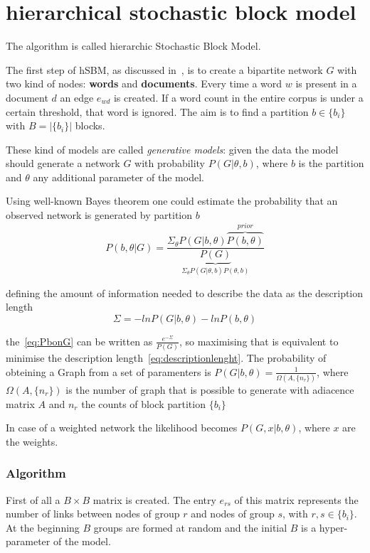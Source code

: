 \appendix
{}
\chapter{hierarchical stochastic block model}
The algorithm is called hierarchic Stochastic Block Model.

The first step of hSBM, as discussed in~\cite{peixoto2014efficient},
is to create a bipartite network $G$ with two kind of nodes: \textbf{words} and \textbf{documents}.
Every time a word $w$ is present in a document $d$ an edge $e_{wd}$ is created.
If a word count in the entire corpus is under a certain threshold, that word is ignored.
The aim is to find a partition $b\in\{b_i\}$ with $B=\left|\{b_i\}\right|$ blocks.

These kind of models are called \textit{generative models}: given the data the model
should generate a network $G$ with probability $P(G|\theta, b)$, where $b$ is
the partition and $\theta$ any additional parameter of the model.

Using well-known Bayes theorem one could estimate the probability that an
observed network is generated by partition $b$
\begin{equation}\label{eq:PbonG}
  P(b,\theta|G)=\frac{\Sigma_{\theta}P(G|b,\theta)\overbrace{P(b,\theta)}^{prior}}{\underbrace{P(G)}_{\Sigma_{\theta}P(G|\theta, b)P(\theta, b)}}
\end{equation}

defining the amount of information needed to describe the data as the description length
\begin{equation}\label{eq:descriptionlenght}
  \Sigma=-lnP(G|b,\theta)-lnP(b, \theta)
\end{equation}

the~\ref{eq:PbonG} can be written as $\frac{e^{-\Sigma}}{P(G)}$, so maximising
that is equivalent to minimise the description
length~\ref{eq:descriptionlenght}.
The probability of obteining a Graph from a set of paramenters is
$P(G|b,\theta)=\frac{1}{\Omega(A,\{n_r\})}$, where $\Omega(A,\{n_r\})$ is the
number of graph that is possible to generate with adiacence matrix $A$ and $n_r$
the counts of block partition $\{b_i\}$

In case of a weighted network the likelihood becomes $P(G,x|b,\theta)$, where $x$
are the weights.

\subsection{Algorithm}
First of all a $B\times B$ matrix is created. The entry $e_{rs}$ of this matrix
represents the number of links between nodes of group $r$ and nodes of group $s$,
with $r,s\in\{b_i\}$. At the beginning $B$ groups are formed at random and the initial $B$ is a hyper-parameter of the model.

